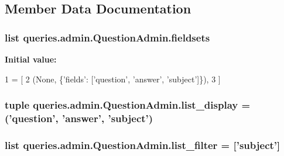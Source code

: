 \subsection{Member Data Documentation}
\hypertarget{classqueries_1_1admin_1_1_question_admin_a526a0fa069499b9b5c02e47090376629}{
\subsubsection[{fieldsets}]{\setlength{\rightskip}{0pt plus 5cm}list queries.\-admin.\-Question\-Admin.\-fieldsets\hspace{0.3cm}{\ttfamily [static]}}}\label{classqueries_1_1admin_1_1_question_admin_a526a0fa069499b9b5c02e47090376629}
{\bfseries Initial value\-:}
\begin{DoxyCode}
1 = [
2         (\textcolor{keywordtype}{None}, \{\textcolor{stringliteral}{'fields'}: [\textcolor{stringliteral}{'question'}, \textcolor{stringliteral}{'answer'}, \textcolor{stringliteral}{'subject'}]\}),
3     ]
\end{DoxyCode}
\hypertarget{classqueries_1_1admin_1_1_question_admin_a42b987bb3e3844a9dcb800b37618ecff}{
\subsubsection[{list\-\_\-display}]{\setlength{\rightskip}{0pt plus 5cm}tuple queries.\-admin.\-Question\-Admin.\-list\-\_\-display = ('question', 'answer', 'subject')\hspace{0.3cm}{\ttfamily [static]}}}\label{classqueries_1_1admin_1_1_question_admin_a42b987bb3e3844a9dcb800b37618ecff}
\hypertarget{classqueries_1_1admin_1_1_question_admin_a435165e182dcf86459386481b5bafcce}{
\subsubsection[{list\-\_\-filter}]{\setlength{\rightskip}{0pt plus 5cm}list queries.\-admin.\-Question\-Admin.\-list\-\_\-filter = \mbox{[}'subject'\mbox{]}\hspace{0.3cm}{\ttfamily [static]}}}\label{classqueries_1_1admin_1_1_question_admin_a435165e182dcf86459386481b5bafcce}
